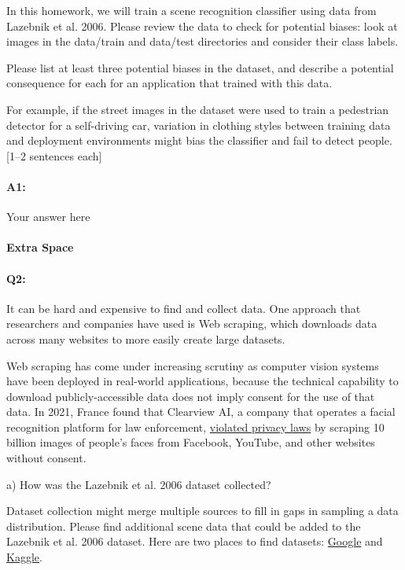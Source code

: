 In this homework, we will train a scene recognition classifier using data from Lazebnik et al. 2006. Please review the data to check for potential biases: look at images in the data/train and data/test directories and consider their class labels. 

Please list at least three potential biases in the dataset, and describe a potential consequence for each for an application that trained with this data.

For example, if the street images in the dataset were used to train a pedestrian detector for a self-driving car, variation in clothing styles between training data and deployment environments might bias the classifier and fail to detect people. [1--2 sentences each]

\paragraph{A1:} Your answer here

\pagebreak
\paragraph{Extra Space}
\pagebreak
 
\paragraph{Q2:}  It can be hard and expensive to find and collect data. One approach that researchers and companies have used is Web scraping, which downloads data across many websites to more easily create large datasets.

Web scraping has come under increasing scrutiny as computer vision systems have been deployed in real-world applications, because the technical capability to download publicly-accessible data does not imply consent for the use of that data. In 2021, France found that Clearview AI, a company that operates a facial recognition platform for law enforcement, \href{https://techcrunch.com/2021/12/16/clearview-gdpr-breaches-france/}{violated privacy laws} by scraping 10 billion images of people's faces from Facebook, YouTube, and other websites without consent.

a) How was the Lazebnik et al. 2006 dataset collected?

Dataset collection might merge multiple sources to fill in gaps in sampling a data distribution. Please find additional scene data that could be added to the Lazebnik et al. 2006 dataset. Here are two places to find datasets: \href{https://datasetsearch.research.google.com}{Google} and \href{https://www.kaggle.com}{Kaggle}. 

